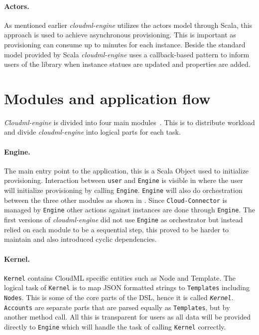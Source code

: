 \paragraph{Actors.}
As mentioned earlier \emph{cloudml-engine} utilizes the actors model through Scala,
this approach is used to achieve asynchronous provisioning.
This is important as provisioning can consume up to minutes for each instance.
Beside the standard model provided by Scala \emph{cloudml-engine} uses
a callback-based pattern to inform users of the library when instance statues
are updated and properties are added.

\section{Modules and application flow}

\emph{Cloudml-engine} is divided into four main modules~.
This is to distribute workload and divide \emph{cloudml-engine} into logical parts for each task.

\paragraph{Engine.} The main entry point to the application, this is a Scala Object used to initialize
provisioning.
Interaction between \texttt{user} and \texttt{Engine} is visible in  
where the user will initialize provisioning by calling \texttt{Engine}.
\texttt{Engine} will also do orchestration between the three other modules
as shown in .
Since \texttt{Cloud-Connector} is managed by \texttt{Engine} other actions against 
instances are done through \texttt{Engine}.
The first versions of \emph{cloudml-engine} did not use \texttt{Engine} as orchestrator but
instead relied on each module to be a sequential step, this proved to be harder to maintain
and also introduced cyclic dependencies.

\paragraph{Kernel.} \texttt{Kernel} contains CloudML specific entities such as Node and Template.
The logical task of \texttt{Kernel} is to map JSON formatted strings to \texttt{Templates} including \texttt{Nodes}.
This is some of the core parts of the DSL, hence it is called \emph{\texttt{Kernel}}.
\texttt{Accounts} are separate parts that are parsed equally as \texttt{Templates},
 but by another method call. All this is transparent for users as all data will
be provided directly to \texttt{Engine} which will handle the task
of calling \texttt{Kernel} correctly.

